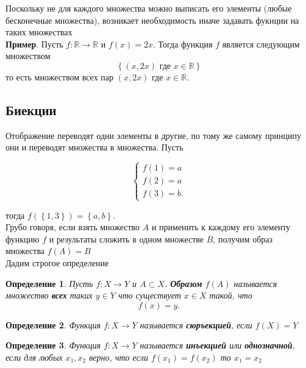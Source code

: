 \documentclass[]{article}
\newtheorem{dfn}{Определение}
\begin{document}
	Поскольку не для каждого множества можно выписать его элементы (любые бесконечные множества), возникает необходимость иначе задавать фукнции на таких множествах
\\
	
	\textbf{Пример}. Пусть $f:\mathbb{R}\rightarrow\mathbb{R}$ и $f(x)=2x$.
	Тогда функция $f$ является следующим множеством 
	\begin{equation}
		\left\{(x,2x)\text{ где }x\in\mathbb{R}\right\}
	\end{equation}
	то есть множеством всех пар $(x,2x)$ где $x\in\mathbb{R}$.
	
	\subsection{Биекции}
	
	Отображение переводят одни элементы в другие, по тому же самому принципу они и переводят множества в множества. Пусть
	
		\begin{equation}
		\begin{cases}
			f(1)=a
			\\
			f(2)=a
			\\
			f(3)=b.
		\end{cases}
	\end{equation}
	
	тогда $f(\left\{1,3\right\})=\left\{a,b\right\}$.
	\\
	
	Грубо говоря, если взять множество $A$ и применить к каждому его элементу функцию $f$ и результаты сложить в одном множестве $B$, получим образ множества $f(A)=B$
	\\
	
	Дадим строгое определение
	
	\begin{dfn}
		Пусть $f:X\rightarrow Y$ и $A\subset X$. \textbf{Образом} $f(A)$ называется множество \textbf{всех} таких $y\in Y$ что существует $x\in X$ такой, что $$f(x)=y.$$
	\end{dfn}
	
	\begin{dfn}
		Функция $f:X\rightarrow Y$ называется \textbf{сюръекцией}, если $f(X) = Y$
	\end{dfn}

	\begin{dfn}
		Функция $f:X\rightarrow Y$ называется \textbf{инъекцией} или \textbf{однозначной}, если для любых $x_1, x_2$ верно, что если $f(x_1)=f(x_2)$ то $x_1=x_2$
	\end{dfn}
\end{document}
